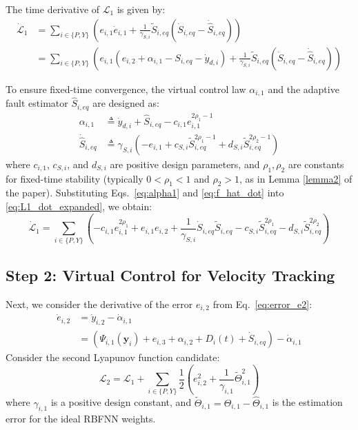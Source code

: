 The time derivative of $\mathcal{L}_1$ is given by:
\begin{align}
    \dot{\mathcal{L}}_1 &= \sum_{i \in \{P,Y\}} \left( e_{i,1} \dot{e}_{i,1} + \frac{1}{\gamma_{S,i}} \widetilde{S}_{i,eq} (\dot{S}_{i,eq} - \dot{\widehat{S}}_{i,eq}) \right) \nonumber \\
    &= \sum_{i \in \{P,Y\}} \left( e_{i,1} (e_{i,2} + \alpha_{i,1} - S_{i,eq} - \dot{y}_{d,i}) + \frac{1}{\gamma_{S,i}} \widetilde{S}_{i,eq} (\dot{S}_{i,eq} - \dot{\widehat{S}}_{i,eq}) \right) \label{eq:L1_dot_expanded}
\end{align}

To ensure fixed-time convergence, the virtual control law $\alpha_{i,1}$ and the adaptive fault estimator $\widehat{S}_{i,eq}$ are designed as:
\begin{align}
    \alpha_{i,1} &\triangleq \dot{y}_{d,i} + \widehat{S}_{i,eq} - c_{i,1} e_{i,1}^{2\rho_1-1} \label{eq:alpha1} \\
    \dot{\widehat{S}}_{i,eq} &\triangleq \gamma_{S,i} (-e_{i,1} + c_{S,i} \widetilde{S}_{i,eq}^{2\rho_1-1} + d_{S,i} \widetilde{S}_{i,eq}^{2\rho_2-1}) \label{eq:f_hat_dot}
\end{align}
where $c_{i,1}$, $c_{S,i}$, and $d_{S,i}$ are positive design parameters, and $\rho_1, \rho_2$ are constants for fixed-time stability (typically $0 < \rho_1 < 1$ and $\rho_2 > 1$, as in Lemma \ref{lemma2} of the paper).
Substituting Eqs.~\eqref{eq:alpha1} and \eqref{eq:f_hat_dot} into \eqref{eq:L1_dot_expanded}, we obtain:
\begin{equation}
    \dot{\mathcal{L}}_1 = \sum_{i \in \{P,Y\}} \left( -c_{i,1} e_{i,1}^{2\rho_1} + e_{i,1} e_{i,2} + \frac{1}{\gamma_{S,i}} \dot{S}_{i,eq} \widetilde{S}_{i,eq} - c_{S,i} \widetilde{S}_{i,eq}^{2\rho_1} - d_{S,i} \widetilde{S}_{i,eq}^{2\rho_2} \right) \label{eq:L1_dot_simplified}
\end{equation}

\subsection{Step 2: Virtual Control for Velocity Tracking}
Next, we consider the derivative of the error $e_{i,2}$ from Eq.~\eqref{eq:error_e2}:
\begin{align}
    \dot{e}_{i,2} &= \dot{y}_{i,2} - \dot{\alpha}_{i,1} \nonumber \\
    &= \left( \Psi_{i,1}(\mathbf{y}_i) + e_{i,3} + \alpha_{i,2} + D_i(t) + \dot{S}_{i,eq} \right) - \dot{\alpha}_{i,1} \label{eq:e2_dot_expanded}
\end{align}
Consider the second Lyapunov function candidate:
\begin{equation}
    \mathcal{L}_2 = \mathcal{L}_1 + \sum_{i \in \{P,Y\}} \frac{1}{2} \left( e_{i,2}^2 + \frac{1}{\gamma_{i,1}} \widetilde{\Theta}_{i,1}^2 \right) \label{eq:lyapunov_L2}
\end{equation}
where $\gamma_{i,1}$ is a positive design constant, and $\widetilde{\Theta}_{i,1} = \Theta_{i,1} - \widehat{\Theta}_{i,1}$ is the estimation error for the ideal RBFNN weights.

